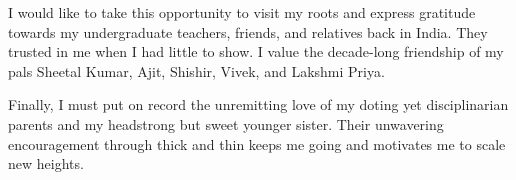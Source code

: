 \begin{acknowledgments}
  I would like to take this opportunity to visit my roots and express gratitude
  towards my undergraduate teachers, friends, and relatives back in India.
  They trusted in me when I had little to show.  I value the decade-long
  friendship of my pals Sheetal Kumar, Ajit, Shishir, Vivek, and Lakshmi Priya.

  Finally, I must put on record the unremitting love of my doting yet
  disciplinarian parents and my headstrong but sweet younger sister.
  Their unwavering encouragement through thick and thin keeps me
  going and motivates me to scale new heights.

\end{acknowledgments}
